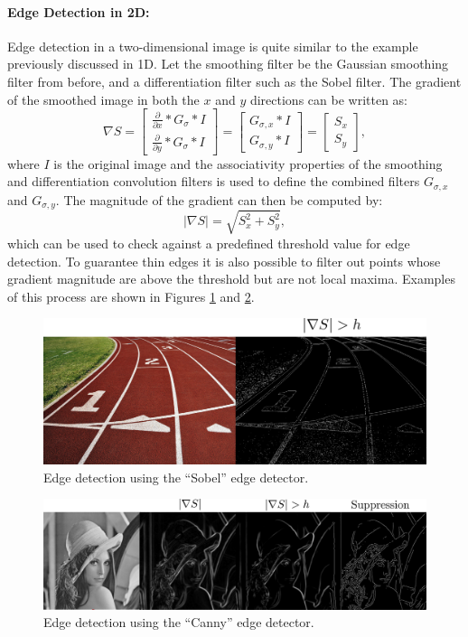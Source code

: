 \paragraph{Edge Detection in 2D:}
Edge detection in a two-dimensional image is quite similar to the example previously discussed in 1D. Let the smoothing filter be the Gaussian smoothing filter from before, and a differentiation filter such as the Sobel filter. The gradient of the smoothed image in both the $x$ and $y$ directions can be written as:
\begin{equation*}
\nabla S= \begin{bmatrix}
\frac{\partial}{\partial x} * G_\sigma * I \\ \frac{\partial}{\partial y} * G_\sigma * I \end{bmatrix}= \begin{bmatrix}
G_{\sigma,x} * I\\G_{\sigma,y} * I
\end{bmatrix}=\begin{bmatrix}
S_x\\S_y
\end{bmatrix},
\end{equation*}
where $I$ is the original image and the associativity properties of the smoothing and differentiation convolution filters is used to define the combined filters $G_{\sigma,x}$ and $G_{\sigma,y}$. The magnitude of the gradient can then be computed by:
\begin{equation*}
\lvert\nabla S\rvert =\sqrt{S_x^2+S_y^2},
\end{equation*}
which can be used to check against a predefined threshold value for edge detection. To guarantee thin edges it is also possible to filter out points whose gradient magnitude are above the threshold but are not local maxima. Examples of this process are shown in Figures \ref{fig:sobel} and \ref{fig:canny}.
\begin{figure}[ht]
  \centering
  \includegraphics[width=.8\textwidth]{tex/figs/ch11_figs/sobel.png}
    \caption{Edge detection using the ``Sobel'' edge detector.}
    \label{fig:sobel}
\end{figure}
\begin{figure}[ht]
  \centering
  \includegraphics[width=.8\textwidth]{tex/figs/ch11_figs/canny.png}
    \caption{Edge detection using the ``Canny'' edge detector.}
    \label{fig:canny}
\end{figure}

